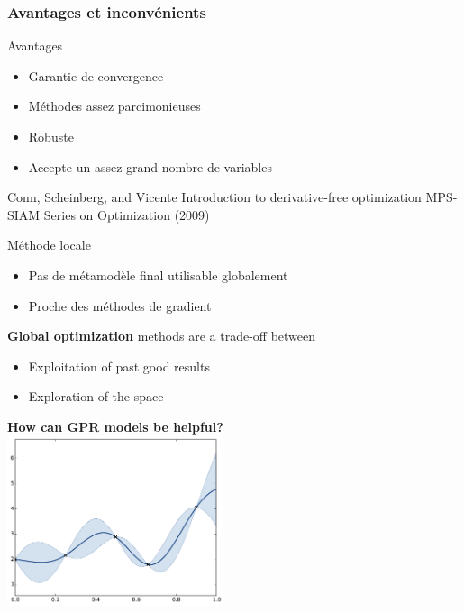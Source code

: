 \documentclass{beamer}
\begin{document}
\begin{frame}
\frametitle{Avantages et inconvénients}
\begin{block}{Avantages}
\begin{itemize}
 \item Garantie de convergence
 \item Méthodes assez parcimonieuses
 \item Robuste
 \item Accepte un assez grand nombre de variables
\end{itemize}
\scriptsize{
 \begin{thebibliography}{1}
\beamertemplatearticlebibitems
     Conn, Scheinberg, and Vicente
         \newblock Introduction to derivative-free optimization
         \newblock MPS-SIAM Series on Optimization (2009)
 \end{thebibliography}}
\end{block}

\begin{alertblock}{Méthode locale}
\begin{itemize}
 \item Pas de métamodèle final utilisable globalement
 \item Proche des méthodes de gradient
\end{itemize}
\end{alertblock}
\end{frame}

\begin{frame}{}
\textbf{Global optimization} methods are a trade-off between
\begin{itemize}
	\item Exploitation of past good results
	\item Exploration of the space
\end{itemize}
\vspace{3mm}
\begin{center}
\textbf{How can GPR models be helpful?}\\
\includegraphics[height=5cm]{figures/python/ego_0}
\end{center}
\end{frame}
\end{document}
